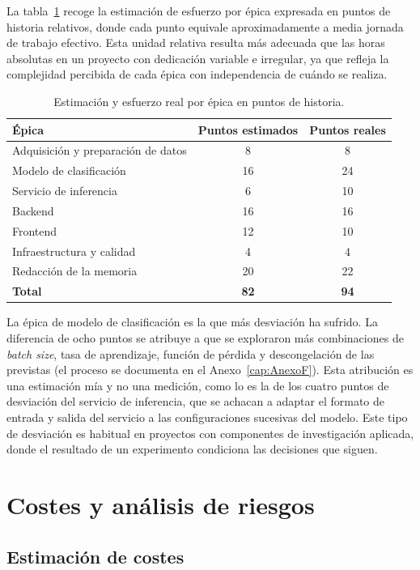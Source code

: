 La tabla~\ref{tab:planificacion} recoge la estimación de esfuerzo por épica expresada en puntos de historia relativos, donde cada punto equivale aproximadamente a media jornada de trabajo efectivo. Esta unidad relativa resulta más adecuada que las horas absolutas en un proyecto con dedicación variable e irregular, ya que refleja la complejidad percibida de cada épica con independencia de cuándo se realiza.

\begin{table}[h]
\centering
\begin{tabular}{lcc}
\hline
\textbf{Épica} & \textbf{Puntos estimados} & \textbf{Puntos reales} \\
\hline
Adquisición y preparación de datos & 8 & 8 \\
Modelo de clasificación & 16 & 24 \\
Servicio de inferencia & 6 & 10 \\
Backend & 16 & 16 \\
Frontend & 12 & 10 \\
Infraestructura y calidad & 4 & 4 \\
Redacción de la memoria & 20 & 22 \\
\hline
\textbf{Total} & \textbf{82} & \textbf{94} \\
\hline
\end{tabular}
\caption{Estimación y esfuerzo real por épica en puntos de historia.}
\label{tab:planificacion}
\end{table}

La épica de modelo de clasificación es la que más desviación ha sufrido. La diferencia de ocho puntos se atribuye a que se exploraron más combinaciones de \emph{batch size}, tasa de aprendizaje, función de pérdida y descongelación de las previstas (el proceso se documenta en el Anexo~\ref{cap:AnexoF}). Esta atribución es una estimación mía y no una medición, como lo es la de los cuatro puntos de desviación del servicio de inferencia, que se achacan a adaptar el formato de entrada y salida del servicio a las configuraciones sucesivas del modelo. Este tipo de desviación es habitual en proyectos con componentes de investigación aplicada, donde el resultado de un experimento condiciona las decisiones que siguen.

\section{Costes y análisis de riesgos}

\subsection{Estimación de costes}

